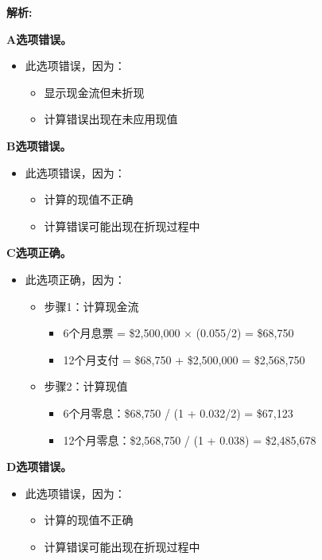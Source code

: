 \documentclass{article}
\newenvironment{explanation}
{\textbf{解析:}\par}
{\par}
\begin{document}
\begin{explanation}
    \textbf{A选项错误。}
    \begin{itemize}
        \item 此选项错误，因为：
        \begin{itemize}
            \item 显示现金流但未折现
            \item 计算错误出现在未应用现值
        \end{itemize}
    \end{itemize}
    \textbf{B选项错误。}
    \begin{itemize}
        \item 此选项错误，因为：
        \begin{itemize}
            \item 计算的现值不正确
            \item 计算错误可能出现在折现过程中
        \end{itemize}
    \end{itemize}
    \textbf{C选项正确。}
    \begin{itemize}
        \item 此选项正确，因为：
        \begin{itemize}
            \item 步骤1：计算现金流
            \begin{itemize}
                \item 6个月息票 = \$2,500,000 × (0.055/2) = \$68,750
                \item 12个月支付 = \$68,750 + \$2,500,000 = \$2,568,750
            \end{itemize}
            \item 步骤2：计算现值
            \begin{itemize}
                \item 6个月零息：\$68,750 / (1 + 0.032/2) = \$67,123
                \item 12个月零息：\$2,568,750 / (1 + 0.038) = \$2,485,678
            \end{itemize}
        \end{itemize}
    \end{itemize}
    \textbf{D选项错误。}
    \begin{itemize}
        \item 此选项错误，因为：
        \begin{itemize}
            \item 计算的现值不正确
            \item 计算错误可能出现在折现过程中
        \end{itemize}
    \end{itemize}
\end{explanation}
\end{document}
